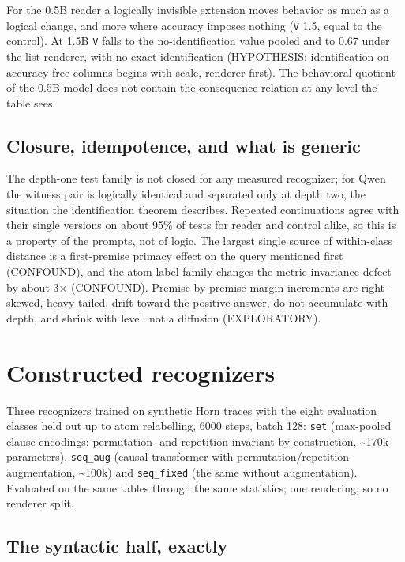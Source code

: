 For the 0.5B reader a logically invisible extension moves behavior as
much as a logical change, and more where accuracy imposes nothing
(\texttt{V} 1.5, equal to the control). At 1.5B \texttt{V} falls to the
no-identification value pooled and to 0.67 under the list renderer, with
no exact identification (HYPOTHESIS: identification on accuracy-free
columns begins with scale, renderer first). The behavioral quotient of
the 0.5B model does not contain the consequence relation at any level
the table sees.

\hypertarget{closure-idempotence-and-what-is-generic}{%
\subsection{Closure, idempotence, and what is
generic}\label{closure-idempotence-and-what-is-generic}}

The depth-one test family is not closed for any measured recognizer; for
Qwen the witness pair is logically identical and separated only at depth
two, the situation the identification theorem describes. Repeated
continuations agree with their single versions on about 95\% of tests
for reader and control alike, so this is a property of the prompts, not
of logic. The largest single source of within-class distance is a
first-premise primacy effect on the query mentioned first (CONFOUND),
and the atom-label family changes the metric invariance defect by about
3× (CONFOUND). Premise-by-premise margin increments are right-skewed,
heavy-tailed, drift toward the positive answer, do not accumulate with
depth, and shrink with level: not a diffusion (EXPLORATORY).

\hypertarget{constructed-recognizers}{%
\section{Constructed recognizers}\label{constructed-recognizers}}

Three recognizers trained on synthetic Horn traces with the eight
evaluation classes held out up to atom relabelling, 6000 steps, batch
128: \texttt{set} (max-pooled clause encodings: permutation- and
repetition-invariant by construction, \textasciitilde170k parameters),
\texttt{seq\_aug} (causal transformer with permutation/repetition
augmentation, \textasciitilde100k) and \texttt{seq\_fixed} (the same
without augmentation). Evaluated on the same tables through the same
statistics; one rendering, so no renderer split.

\hypertarget{the-syntactic-half-exactly}{%
\subsection{The syntactic half,
exactly}\label{the-syntactic-half-exactly}}

